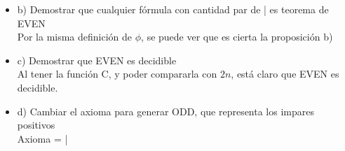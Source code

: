 \documentclass{article}
\begin{document}
\begin{itemize}
\begin{itemize}
\begin{alignat*}{2}
				      \intertext{Definición de cualquier $\phi$ mediante Pile:}
				      \vdash_{\textrm{\tiny{EVEN}}} \phi & \equiv \left[\left(\exists \psi\, \vert\, \vdash_{\textrm{\tiny{EVEN}}} \psi \wedge \textrm{Pile}[\psi] = \phi\right) \vee \left(\textrm{Pile}[||] = \phi\right) \right]
				      \intertext{En Pile:}
				      C(\phi||)                          & = 2n                                                                                                                                                                     \\
				      C(\phi) + 2                        & = 2n \tag*{\textit{true} (por definición de $\phi$, $2$ es par)}
			      \end{alignat*}
			\item b) Demostrar que cualquier fórmula con cantidad par de | es teorema de EVEN\\
			      Por la misma definición de $\phi$, se puede ver que es cierta la proposición b)
			\item c) Demostrar que EVEN es decidible\\
			      Al tener la función C, y poder compararla con $2n$, está claro que EVEN es decidible.
			\item d) Cambiar el axioma para generar ODD, que representa los impares positivos\\
			      Axioma = |


\end{itemize}
\end{itemize}
\end{document}

